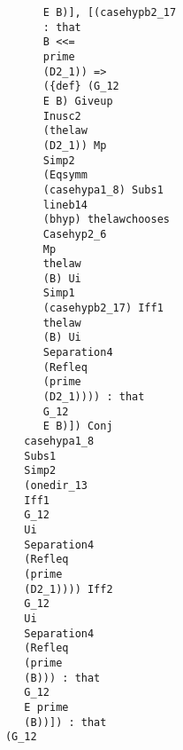 \documentclass[12pt]{article}
\begin{document}
\begin{verbatim}
                                           E B)], [(casehypb2_17 
                                           : that 
                                           B <<= 
                                           prime 
                                           (D2_1)) => 
                                           ({def} (G_12 
                                           E B) Giveup 
                                           Inusc2 
                                           (thelaw 
                                           (D2_1)) Mp 
                                           Simp2 
                                           (Eqsymm 
                                           (casehypa1_8) Subs1 
                                           lineb14 
                                           (bhyp) thelawchooses 
                                           Casehyp2_6 
                                           Mp 
                                           thelaw 
                                           (B) Ui 
                                           Simp1 
                                           (casehypb2_17) Iff1 
                                           thelaw 
                                           (B) Ui 
                                           Separation4 
                                           (Refleq 
                                           (prime 
                                           (D2_1)))) : that 
                                           G_12 
                                           E B)]) Conj 
                                        casehypa1_8 
                                        Subs1 
                                        Simp2 
                                        (onedir_13 
                                        Iff1 
                                        G_12 
                                        Ui 
                                        Separation4 
                                        (Refleq 
                                        (prime 
                                        (D2_1)))) Iff2 
                                        G_12 
                                        Ui 
                                        Separation4 
                                        (Refleq 
                                        (prime 
                                        (B))) : that 
                                        G_12 
                                        E prime 
                                        (B))]) : that 
                                     (G_12 

\end{verbatim}
\end{document}
